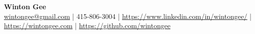 \documentclass[a4paper,10pt]{article}
\begin{document}
\begin{center}
    \textbf{\Large Winton Gee} \\
    \href{mailto:wintongee@gmail.com}{wintongee@gmail.com} | 415-806-3004 | \href{https://www.linkedin.com/in/wintongee/}{https://www.linkedin.com/in/wintongee/} | \href{https://wintongee.com}{https://wintongee.com} | \href{https://github.com/wintongee}{https://github.com/wintongee}
\end{center}
\end{document}
